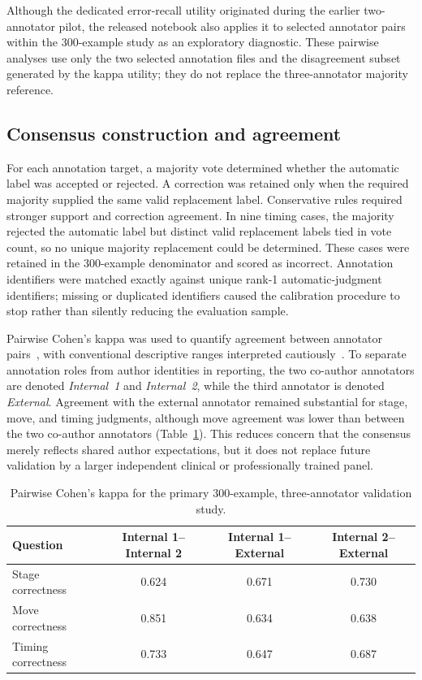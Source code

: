 \documentclass[preprint,12pt,a4paper]{elsarticle}
\begin{document}
Although the dedicated error-recall utility originated during the earlier two-annotator pilot, the released notebook also applies it to selected annotator pairs within the 300-example study as an exploratory diagnostic. These pairwise analyses use only the two selected annotation files and the disagreement subset generated by the kappa utility; they do not replace the three-annotator majority reference.

\subsection{Consensus construction and agreement}

For each annotation target, a majority vote determined whether the automatic label was accepted or rejected. A correction was retained only when the required majority supplied the same valid replacement label. Conservative rules required stronger support and correction agreement. In nine timing cases, the majority rejected the automatic label but distinct valid replacement labels tied in vote count, so no unique majority replacement could be determined. These cases were retained in the 300-example denominator and scored as incorrect. Annotation identifiers were matched exactly against unique rank-1 automatic-judgment identifiers; missing or duplicated identifiers caused the calibration procedure to stop rather than silently reducing the evaluation sample.

Pairwise Cohen's kappa was used to quantify agreement between annotator pairs~\cite{Cohen1960Kappa}, with conventional descriptive ranges interpreted cautiously~\cite{Landis1977Kappa}. To separate annotation roles from author identities in reporting, the two co-author annotators are denoted \emph{Internal~1} and \emph{Internal~2}, while the third annotator is denoted \emph{External}. Agreement with the external annotator remained substantial for stage, move, and timing judgments, although move agreement was lower than between the two co-author annotators (Table~\ref{tab:pairwise_kappa}). This reduces concern that the consensus merely reflects shared author expectations, but it does not replace future validation by a larger independent clinical or professionally trained panel.

\begin{table}[!htbp]
\centering
\caption{Pairwise Cohen's kappa for the primary 300-example, three-annotator validation study.}
\label{tab:pairwise_kappa}
\small
\setlength{\tabcolsep}{6pt}
\renewcommand{\arraystretch}{1.15}
\begin{tabular}{lccc}
\toprule
\textbf{Question} &
\textbf{Internal 1--Internal 2} &
\textbf{Internal 1--External} &
\textbf{Internal 2--External} \\
\midrule
Stage correctness  & 0.624 & 0.671 & 0.730 \\
Move correctness   & 0.851 & 0.634 & 0.638 \\
Timing correctness & 0.733 & 0.647 & 0.687 \\
\bottomrule
\end{tabular}
\end{table}
\end{document}
